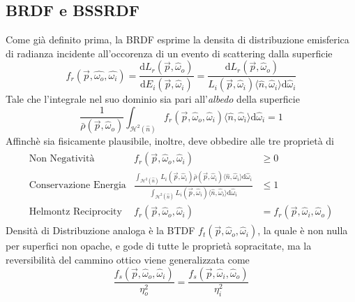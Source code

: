 \subsection{BRDF e BSSRDF}
Come gi\`a definito prima, la \Gls{BRDF}\footnotemark{} esprime la densita di distribuzione emisferica di radianza incidente all'occorenza di un 
evento di scattering dalla superficie
\begin{equation*}
	f_r(\vec{p},\hat{\omega_o},\hat{\omega_i}) = \frac{\mathrm{d}L_r(\vec{p}, \hat{\omega}_o)}{\mathrm{d}E_i(\vec{p}, \hat{\omega}_i)}
		= \frac{\mathrm{d}L_r(\vec{p}, \hat{\omega}_o)}{L_i(\vec{p}, \hat{\omega}_i)\langle\hat{n},\hat{\omega}_i\rangle\mathrm{d}\hat{\omega}_i}
\end{equation*}
Tale che l'integrale nel suo dominio sia pari all'\textit{albedo} della superficie
\begin{equation*}
	\frac{1}{\bar{\rho}(\vec{p},\hat{\omega}_o)}%
		\int_{\mathcal{H}^2(\hat{n})}f_r(\vec{p},\hat{\omega}_o,\hat{\omega}_i)\langle\hat{n},\hat{\omega}_i\rangle\mathrm{d}\hat{\omega}_i = 1
\end{equation*}
Affinch\`e sia fisicamente plausibile, inoltre, deve obbedire alle tre propriet\`a di
{
	\newcommand{\brdf}{f_r(\vec{p},\hat{\omega}_o,\hat{\omega}_i)}
	\begin{align}
		\begin{array}{lrl}
			\text{Non Negativit\`a} & \brdf & \geq 0 \\
			\text{Conservazione Energia} & {\displaystyle\frac
				{\int_{\mathcal{H}^2(\hat{n})}L_i(\vec{p},\hat{\omega}_i)\bar{\rho}(\vec{p},\hat{\omega}_i)\langle\hat{n},\hat{\omega}_i\rangle%
					\mathrm{d}\hat{\omega}_i}%
				{\int_{\mathcal{H}^2(\hat{n})}L_i(\vec{p},\hat{\omega}_i)\langle\hat{n},\hat{\omega}_i\rangle\mathrm{d}\hat{\omega}_i}} & \leq 1 \\
			\text{Helmontz Reciprocity} & \brdf & = f_r(\vec{p},\hat{\omega}_i,\hat{\omega}_o)
		\end{array}
	\end{align}
}
Densit\`a di Distribuzione analoga \`e la BTDF $f_t(\vec{p},\hat{\omega}_o,\hat{\omega}_i)$, la quale \`e non nulla per superfici non opache, e gode
di tutte le propriet\`a sopracitate, ma la reversibilit\`a del cammino ottico viene generalizzata come\footnotemark{}
\begin{equation}
	\frac{f_s(\vec{p},\hat{\omega}_o,\hat{\omega}_i)}{\eta_o^2} = \frac{f_s(\vec{p},\hat{\omega}_i,\hat{\omega}_o)}{\eta_i^2}
\end{equation}
